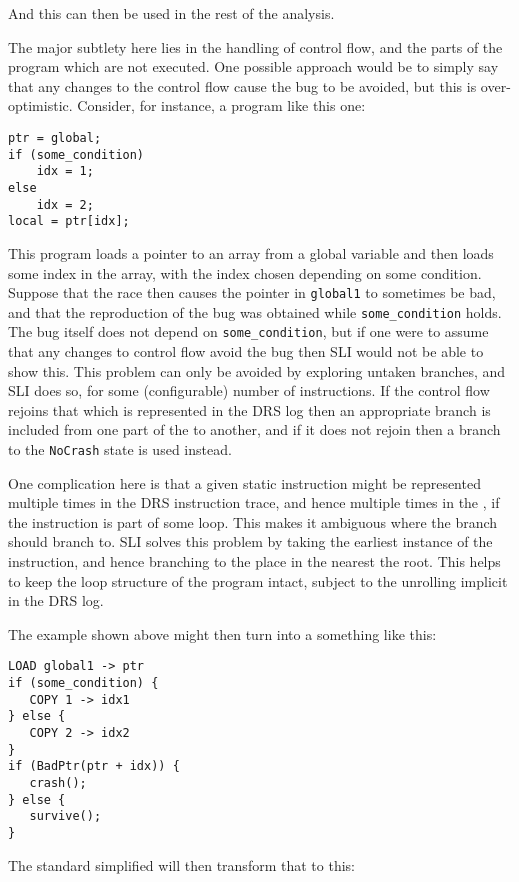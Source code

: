 And this can then be used in the rest of the analysis.

The major subtlety here lies in the handling of control flow, and the parts of the program which are not executed.
One possible approach would be to simply say that any changes to the control flow cause the bug to be avoided, but this is over-optimistic.
Consider, for instance, a program like this one:

\begin{verbatim}
ptr = global;
if (some_condition)
    idx = 1;
else
    idx = 2;
local = ptr[idx];
\end{verbatim}

This program loads a pointer to an array from a global variable and then loads some index in the array, with the index chosen depending on some condition.
Suppose that the race then causes the pointer in \verb|global1| to sometimes be bad, and that the reproduction of the bug was obtained while \verb|some_condition| holds.
The bug itself does not depend on \verb|some_condition|, but if one were to assume that any changes to control flow avoid the bug then SLI would not be able to show this.
This problem can only be avoided by exploring untaken branches, and SLI does so, for some (configurable) number of instructions.
If the control flow rejoins that which is represented in the DRS log then an appropriate branch is included from one part of the \StateMachine to another, and if it does not rejoin then a branch to the \verb|NoCrash| state is used instead.

One complication here is that a given static instruction might be represented multiple times in the DRS instruction trace, and hence multiple times in the \StateMachine, if the instruction is part of some loop.
This makes it ambiguous where the branch should branch to.
SLI solves this problem by taking the earliest instance of the instruction, and hence branching to the place in the \StateMachine nearest the root.
This helps to keep the loop structure of the program intact, subject to the unrolling implicit in the DRS log.

The example shown above might then turn into a \StateMachine something like this:

\begin{verbatim}
LOAD global1 -> ptr
if (some_condition) {
   COPY 1 -> idx1
} else {
   COPY 2 -> idx2
}
if (BadPtr(ptr + idx)) {
   crash();
} else {
   survive();
}
\end{verbatim}

The standard simplified will then transform that to this:

